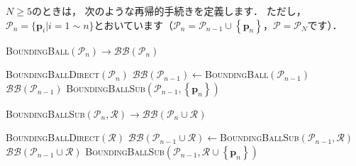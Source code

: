 ﻿\documentclass[a4paper]{jsarticle}
\begin{document}
$N\geq 5$のときは，
次のような再帰的手続きを定義します．
ただし，$\mathcal{P}_{n}=\{\boldsymbol{p}_{i}|i=1\sim n\}$とおいています（$\mathcal{P}_{n}=\mathcal{P}_{n-1}\cup\left\{\boldsymbol{p}_{n}\right\}$，$\mathcal{P}=\mathcal{P}_{N}$です）．
\begin{algorithm}[h]
\caption{\textsc{BoundingBall}$(\mathcal{P}_{n})\rightarrow\mathcal{BB}(\mathcal{P}_{n})$}
\begin{algorithmic}[1]
   \textsc{BoundingBallDirect}$(\mathcal{P}_{n})$
\EndIf
\State $\mathcal{BB}(\mathcal{P}_{n-1})\leftarrow$\textsc{BoundingBall}$(\mathcal{P}_{n-1})$
   $\mathcal{BB}(\mathcal{P}_{n-1})$
\EndIf
{} \textsc{BoundingBallSub}$(\mathcal{P}_{n-1},\left\{\boldsymbol{p}_{n}\right\})$
\end{algorithmic}
\end{algorithm}

\begin{algorithm}[h]
\caption{\textsc{BoundingBallSub}$(\mathcal{P}_{n},\mathcal{R})\rightarrow\mathcal{BB}(\mathcal{P}_{n}\cup\mathcal{R})$}
\begin{algorithmic}[1]
   \textsc{BoundingBallDirect}$(\mathcal{R})$
\EndIf
\State $\mathcal{BB}(\mathcal{P}_{n-1}\cup\mathcal{R})\leftarrow$\textsc{BoundingBallSub}$(\mathcal{P}_{n-1},\mathcal{R})$
   $\mathcal{BB}(\mathcal{P}_{n-1}\cup\mathcal{R})$
\EndIf
{} \textsc{BoundingBallSub}$(\mathcal{P}_{n-1},\mathcal{R}\cup\left\{\boldsymbol{p}_{n}\right\})$
\end{algorithmic}
\end{algorithm}
\end{document}
